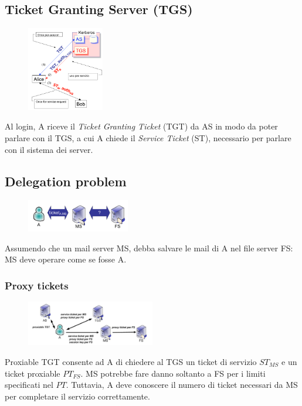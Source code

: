 \documentclass[a4paper,12pt]{article}
\begin{document}
\subsection{Ticket Granting Server (TGS)}
\begin{figure}[H]
  \centering
  \includegraphics[width=0.3\textwidth]{img/tgs}
\end{figure}
Al login, A riceve il \textit{Ticket Granting Ticket} (TGT) da AS in modo da poter parlare con il TGS, a cui A chiede il \textit{Service Ticket} (ST), necessario per parlare con il sistema dei server.

\subsection{Delegation problem}
\begin{figure}[H]
  \centering
  \includegraphics[width=0.4\textwidth]{img/delegation}
\end{figure}
Assumendo che un mail server MS, debba salvare le mail di A nel file server FS: MS deve operare come se fosse A.

\subsubsection{Proxy tickets}

\begin{figure}[H]
  \centering
  \includegraphics[width=0.5\textwidth]{img/proxy}
\end{figure}
Proxiable TGT consente ad A di chiedere al TGS un ticket di servizio $ST_{MS}$ e un ticket proxiable $PT_{FS}$.
MS potrebbe fare danno soltanto a FS per i limiti specificati nel $PT$. Tuttavia, A deve conoscere il numero di ticket necessari da MS per completare il servizio correttamente.
\end{document}
